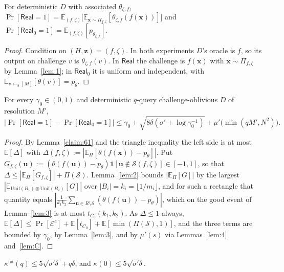 \documentclass{aicr-solution}
\newcommand{\Real}{\mathsf{Real}}
\newcommand{\Prob}[1]{\Pr\!\left[#1\right]}
\newcommand{\Exp}{\mathbb{E}}
\newcommand{\vx}{\mathbf{x}}
\newcommand{\vz}{\mathbf{z}}
\newcommand{\vu}{\mathbf{u}}
\newcommand{\ind}{\mathbb{1}}
\newcommand{\Unif}{\mathrm{Unif}}
\newcommand{\kna}{\kappa^{\mathrm{na}}}
\begin{document}
\begin{lemma}\label{claim:61}
For deterministic $D$ with associated $\theta_{\zeta,f}$,
$\Prob{\Real = 1} = \Exp_{(f,\zeta)}\bigl[\Exp_{\vx \sim \Pi_{f,\zeta}}
[\theta_{\zeta,f}(f(\vx))]\bigr]$ and
$\Prob{\Real_0 = 1} = \Exp_{(f,\zeta)}[p_{\theta_{\zeta,f}}]$.
\end{lemma}

\begin{proof}
Condition on $(H,\vz) = (f,\zeta)$. In both experiments $D$'s oracle is $f$, so its
output on challenge $v$ is $\theta_{\zeta,f}(v)$. In $\Real$ the challenge is
$f(\vx)$ with $\vx \sim \Pi_{f,\zeta}$ by Lemma~\ref{lem:1}; in $\Real_0$ it is
uniform and independent, with $\Exp_{v \gets_{\$} [M]}[\theta(v)] = p_\theta$.
\end{proof}

\begin{proposition}\label{prop:62}
For every $\gamma_0 \in (0,1)$ and deterministic $q$-query challenge-oblivious $D$
of resolution $M'$,
\[
  \bigl|\Prob{\Real = 1} - \Prob{\Real_0 = 1}\bigr| \le
  \gamma_0 + \sqrt{8\delta(\sigma' + \log\gamma_0^{-1})}
  + \mu'\bigl(\min(qM',N^{2})\bigr).
\]
\end{proposition}

\begin{proof}
By Lemma~\ref{claim:61} and the triangle inequality the left side is at most
$\Exp[\Delta]$ with
$\Delta(f,\zeta) := |\Exp_{\Pi}[\theta(f(\vx)) - p_\theta]|$. Put
$G_{f,\zeta}(\vu) := (\theta(f(\vu)) - p_\theta)\ind[\vu \notin \mathcal{S}(f,\zeta)]
\in [-1,1]$, so that
$\Delta \le |\Exp_{\Pi}[G_{f,\zeta}]| + \Pi(\mathcal{S})$. Lemma~\ref{lem:2} bounds
$|\Exp_{\Pi}[G]|$ by the largest
$|\Exp_{\Unif(B_1) \otimes \Unif(B_2)}[G]|$ over $|B_i| = k_i = \lfloor 1/m_i\rfloor$,
and for such a rectangle that quantity equals
$|\frac{1}{k_1k_2}\sum_{\vu \in R \setminus \mathcal{S}}(\theta(f(\vu)) - p_\theta)|$,
which on the good event of Lemma~\ref{lem:3} is at most $t_{C_0}(k_1,k_2)$. As
$\Delta \le 1$ always,
$\Exp[\Delta] \le \Prob{\mathcal{E}^{c}} + \Exp[t_{C_0}]
+ \Exp[\min(\Pi(\mathcal{S}),1)]$, and the three terms are bounded by $\gamma_0$,
by Lemma~\ref{lem:3}, and by $\mu'(s)$ via Lemmas~\ref{lem:4} and~\ref{lem:C}.
\end{proof}

\begin{theorem}\label{thm:A}
$\kna(q) \le 5\sqrt{\sigma'\delta} + q\delta$, and
$\kappa(0) \le 5\sqrt{\sigma'\delta}$.
\end{theorem}
\end{document}

